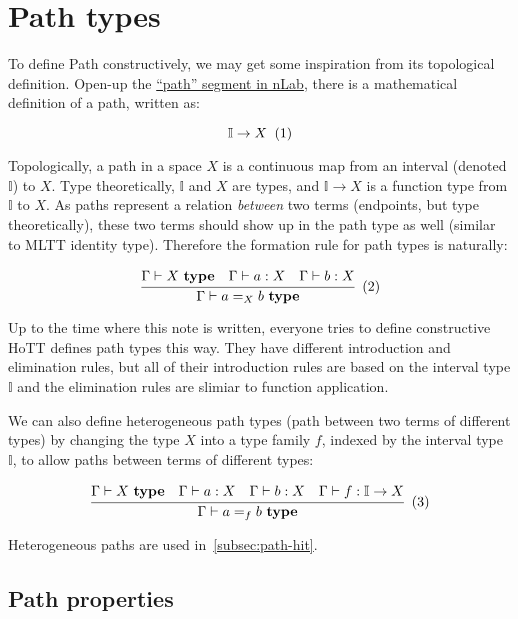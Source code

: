 \section{Path types}
\label{sec:path}

To define Path constructively,
we may get some inspiration from its topological definition.
Open-up the \href{https://ncatlab.org/nlab/show/path}{``path'' segment in nLab},
there is a mathematical definition of a path, written as:

\[
  \mathbb I \rightarrow X
  \xtag
\]

Topologically, a path in a space $X$ is a continuous map
from an interval (denoted $\mathbb I$) to $X$.
Type theoretically, $\mathbb I$ and $X$ are types,
and $\mathbb I \rightarrow X$ is a function type from $\mathbb I$ to $X$.
As paths represent a relation \textit{between} two terms
(endpoints, but type theoretically),
these two terms should show up in the path type as well
(similar to MLTT identity type).
Therefore the formation rule for path types is naturally:

\[
  \cfrac{
    \Gamma \vdash X \ \textbf{type}
    \quad
    \Gamma \vdash a : X
    \quad
    \Gamma \vdash b : X
  }{\Gamma \vdash a =_X b \ \textbf{type}}
  \xtag
\]

Up to the time where this note is written,
everyone tries to define constructive HoTT defines path types this way.
They have different introduction and elimination rules,
but all of their introduction rules are
based on the interval type $\mathbb I$
and the elimination rules are slimiar to function application.

We can also define heterogeneous path types
(path between two terms of different types)
by changing the type $X$ into a type family $f$,
indexed by the interval type $\mathbb I$,
to allow paths between terms of different types:

\[
  \cfrac{
    \Gamma \vdash X \ \textbf{type}
    \quad
    \Gamma \vdash a : X
    \quad
    \Gamma \vdash b : X
    \quad
    \Gamma \vdash f : \mathbb I \rightarrow X
  }{\Gamma \vdash a =_f b \ \textbf{type}}
  \xtag \label{eqn:hetero-path}
\]

Heterogeneous paths are used in~\cref{subsec:path-hit}.



\subsection{Path properties}
\label{subsec:path-prop}


